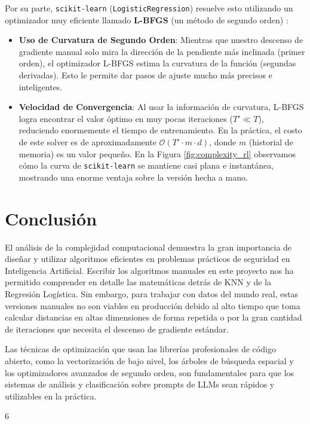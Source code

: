 \documentclass[twocolumn,10pt,journal]{IEEEtran}
\begin{document}
\begin{table}[t]
Por su parte, \texttt{scikit-learn} (\texttt{LogisticRegression}) resuelve esto utilizando un optimizador muy eficiente llamado \textbf{L-BFGS} (un método de segundo orden) \cite{nocedal2006}:
\begin{itemize}
    \item \textbf{Uso de Curvatura de Segundo Orden}: Mientras que nuestro descenso de gradiente manual solo mira la dirección de la pendiente más inclinada (primer orden), el optimizador L-BFGS estima la curvatura de la función (segundas derivadas). Esto le permite dar pasos de ajuste mucho más precisos e inteligentes.
    \item \textbf{Velocidad de Convergencia}: Al usar la información de curvatura, L-BFGS logra encontrar el valor óptimo en muy pocas iteraciones ($T' \ll T$), reduciendo enormemente el tiempo de entrenamiento. En la práctica, el costo de este solver es de aproximadamente $\mathcal{O}(T' \cdot m \cdot d)$, donde $m$ (historial de memoria) es un valor pequeño. En la Figura \ref{fig:complexity_rl} observamos cómo la curva de \texttt{scikit-learn} se mantiene casi plana e instantánea, mostrando una enorme ventaja sobre la versión hecha a mano.
\end{itemize}

\section{Conclusión}
El análisis de la complejidad computacional demuestra la gran importancia de diseñar y utilizar algoritmos eficientes en problemas prácticos de seguridad en Inteligencia Artificial. Escribir los algoritmos manuales en este proyecto nos ha permitido comprender en detalle las matemáticas detrás de KNN y de la Regresión Logística. Sin embargo, para trabajar con datos del mundo real, estas versiones manuales no son viables en producción debido al alto tiempo que toma calcular distancias en altas dimensiones de forma repetida o por la gran cantidad de iteraciones que necesita el descenso de gradiente estándar.

Las técnicas de optimización que usan las librerías profesionales de código abierto, como la vectorización de bajo nivel, los árboles de búsqueda espacial y los optimizadores avanzados de segundo orden, son fundamentales para que los sistemas de análisis y clasificación sobre prompts de LLMs sean rápidos y utilizables en la práctica.

\begin{thebibliography}{6}


\end{thebibliography}
\end{table}
\end{document}
